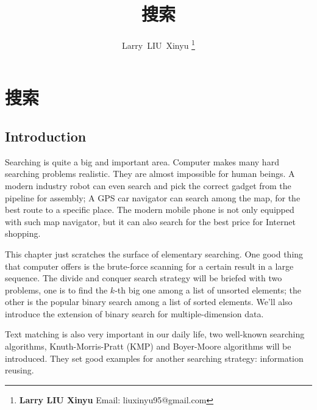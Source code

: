 \documentclass[UTF8]{article}
\begin{document}


\title{搜索}

\author{Larry~LIU~Xinyu
\thanks{{\bfseries Larry LIU Xinyu } \newline
  Email: liuxinyu95@gmail.com \newline}
  }

\maketitle
\fi


\ifx\wholebook\relax
\chapter{搜索}
\fi

\section{Introduction}
\label{introduction}
Searching is quite a big and important area. Computer makes many hard
searching problems realistic. They are almost impossible for human beings.
A modern industry robot can even search and pick the correct gadget from
the pipeline for assembly; A GPS car navigator can search among the
map, for the best route to a specific place. The modern mobile phone
is not only equipped with such map navigator, but it can also search
for the best price for Internet shopping.

This chapter just scratches the surface of elementary searching. One
good thing that computer offers is the brute-force scanning for a
certain result in a large sequence. The divide and conquer
search strategy will be briefed with two problems, one is to find
the $k$-th big one among a list of unsorted elements; the other
is the popular binary search among a list of sorted elements.
We'll also introduce the extension of binary search for
multiple-dimension data.

Text matching is also very important in our daily life, two well-known
searching algorithms, Knuth-Morris-Pratt (KMP) and Boyer-Moore algorithms
will be introduced. They set good examples for another searching strategy:
information reusing.
\end{document}
